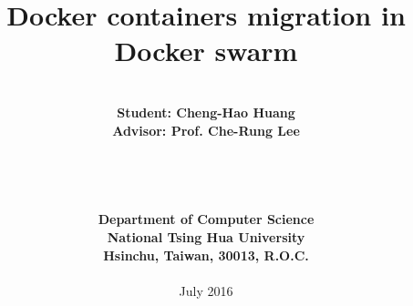 \documentclass[a4paper,12pt]{report}
\begin{document}

%

\title{\bf \huge Docker containers migration in Docker swarm}
\date{}
\author{
\begin{tabular}{c}
\\
\\
{\LARGE \bf Student: Cheng-Hao Huang}\\
{\LARGE \bf Advisor: Prof. Che-Rung Lee}\\
\\
\\
\\
\\
{\LARGE \bf Department of Computer Science}\\
{\LARGE \bf National Tsing Hua University}\\
{\LARGE \bf Hsinchu, Taiwan, 30013, R.O.C.}\\
\\
{\large July 2016}
\end{tabular}
}

\maketitle
{}







\setcounter{page}{4}
\tableofcontents
\clearpage
{}
\listoffigures
\clearpage
{}
\listoftables
\clearpage
{}
\listofalgorithms
\clearpage


\setcounter{page}{1}









%
%
\end{document}
